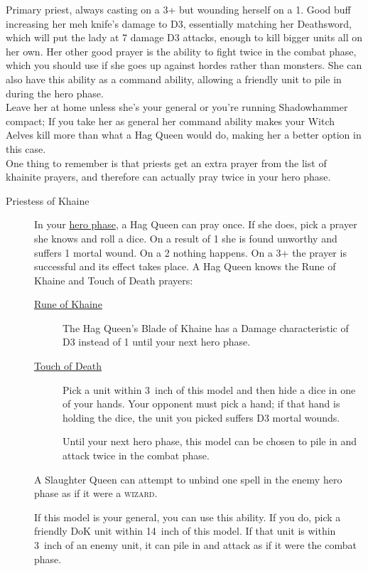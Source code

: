 Primary priest, always casting on a 3+ but wounding herself on a 1.
Good buff increasing her meh knife's damage to D3, essentially matching her Deathsword,
which will put the lady at 7 damage D3 attacks, enough to kill bigger units all
on her own. Her other good prayer is the ability to fight twice in the combat
phase, which you should use if she goes up against hordes rather than monsters.
She can also have this ability as a command ability, allowing a friendly unit
to pile in during the hero phase. \\
Leave her at home unless she's your general or you're running Shadowhammer
compact; If you take her as general her command ability makes your Witch
Aelves kill more than what a Hag Queen would do, making her a better option in
this case. \\
One thing to remember is that priests get an extra prayer from the list of
khainite prayers, and therefore can actually pray twice in your hero phase.
\begin{description}
    \item [Priestess of Khaine] In your \hyperref[hero-phase]{hero phase},
        a Hag Queen can pray once. If she does, pick a prayer she knows and
        roll a dice. On a result of 1 she is found unworthy and suffers
        1 mortal wound. On a 2 nothing happens. On a 3+ the prayer is
          successful and its effect takes place.  A Hag Queen knows the Rune of
          Khaine and Touch of Death prayers:
        \begin{description}
            \item [{\hyperref[rune-of-khaine]{Rune of Khaine}}] The Hag Queen's
                Blade of Khaine has a Damage characteristic of D3 instead of
                1 until your next hero phase.
            \item [{\hyperref[Touch-of-death]{Touch of Death}}] Pick a unit within
                3~inch of this model and then hide a dice in one of your hands.
                Your opponent must pick a hand; if that hand is holding the
                dice, the unit you picked suffers D3 mortal wounds.
            \item [] Until your next hero
                phase, this model can be chosen to pile in and attack twice in
                the combat phase.
        \end{description}
    \item [] A Slaughter Queen can
        attempt to unbind one spell in the enemy hero phase as if it were
        a \textsc{wizard}.
    \item [] If this model is
        your general, you can use this ability. If you do, pick a friendly
        DoK unit within 14~inch of this model. If that unit is
        within 3~inch of an enemy unit, it can pile in and attack as if it were the
        combat phase.
\end{description}


